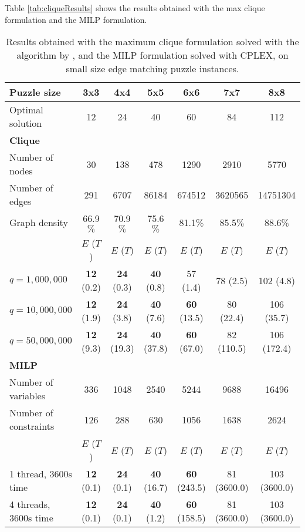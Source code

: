\documentclass[preprint,12pt]{elsarticle}
\begin{document}
{Table \ref{tab:cliqueResults} shows the results obtained with the max clique formulation and the MILP formulation.
\begin{table}
\scriptsize
	\centering
		\begin{tabular}{|l|c|c|c|c|c|c|}
		\hline
Puzzle size			 & 3x3    & 4x4   & 5x5   & 6x6   & 7x7  & 8x8  \\
			 \hline 
Optimal solution & 12 & 24 & 40 & 60 & 84 & 112 \\
\hline \hline
			\textbf{Clique} & & & & & & \\
			\hline
Number of nodes & 30 & 138 & 478 & 1290  & 2910  & 5770\\
\hline
Number of edges & 291 & 6707 & 86184 & 674512 & 3620565 & 14751304 \\
\hline
Graph density & 66.9$\%$ & 70.9$\%$ & 75.6$\%$ & 81.1$\%$ & 85.5$\%$ & 88.6$\%$ \\
\hline
 & $E$ ($T$) & $E$ ($T$) & $E$ ($T$) & $E$ ($T$) & $E$ ($T$) & $E$ ($T$)   \\
$q=1,000,000$ & \textbf{12} (0.2) & \textbf{24} (0.3) & \textbf{40} (0.8) & 57 (1.4) & 78 (2.5) & 102 (4.8) \\
$q=10,000,000$ & \textbf{12} (1.9) & \textbf{24} (3.8) & \textbf{40} (7.6) & \textbf{60} (13.5) & 80 (22.4) & 106 (35.7) \\
$q=50,000,000$ & \textbf{12} (9.3) & \textbf{24} (19.3) & \textbf{40} (37.8) & \textbf{60} (67.0) & 82 (110.5) & 106 (172.4) \\
		\hline \hline
			\textbf{MILP} & & & & & & \\
		\hline
			Number of variables & 336 & 1048 & 2540 & 5244  & 9688  & 16496\\
		\hline
			Number of constraints & 126 & 288 & 630 & 1056  & 1638  & 2624\\
		\hline
		 & $E$ ($T$) & $E$ ($T$) & $E$ ($T$) & $E$ ($T$) & $E$ ($T$) & $E$ ($T$)   \\
1 thread, 3600s time  & \textbf{12} (0.1) & \textbf{24} (0.1) & \textbf{40} (16.7) & \textbf{60} (243.5) & 81 (3600.0) & 103 (3600.0) \\
4 threads, 3600s time  & \textbf{12} (0.1) & \textbf{24} (0.1) & \textbf{40} (1.2) & \textbf{60} (158.5) & 81 (3600.0) & 103 (3600.0) \\
\hline
		\end{tabular}
	\caption{Results obtained with the maximum clique formulation solved with the algorithm by \cite{GLP08}, and the MILP formulation solved with CPLEX, on small size edge matching puzzle instances.}

\end{table}}
\end{document}
